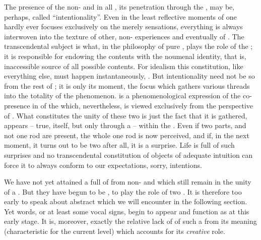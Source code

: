 The presence of the non- and  in all , its penetration
through the , may be, perhaps, called ``intentionality''.  Even in
the least reflective moments of  one hardly ever focuses
exclusively on the merely  sensations, everything is always
interwoven into the texture of other, non- experiences and eventually
of .  The
transcendental subject is what, in the philosophy of pure , plays the
role of the ; it is responsible for endowing the 
contents with the noumenal identity, that is, inaccessible source of all
possible contents.  For idealism this constitution, like everything else, must
happen instantaneously, .  But intentionality need not be so
 from the rest of ; it is only its 
moment, the focus which gathers various threads into the totality of the
 phenomenon.   is a phenomenological expression
of the co-presence in  of the  which,
nevertheless, is viewed exclusively from the perspective of .
What constitutes the unity of these two  is just the fact that it is
gathered, appears -- true, itself, but only through a  -- within the
\hoa.  Even if two parts, and not one rod are present, the whole one rod is now
perceived, and if, in the next moment, it turns out to be two after all, it is a
surprise.  Life is full of such surprises and no transcendental constitution of
objects of adequate intuition can force it to always conform to our
expectations, sorry, intentions.

\pa\label{pa:languageA} We have not yet attained a full  of
 from 
non- and 
 which still remain in the unity of a  \nexus. But
they have begun to be , to play the role of two . It is therefore too early to speak about abstract  which we
will encounter in the following section. Yet words, or at least some vocal
signs, begin to appear and function as  at this early stage. It is,
moreover, exactly the relative lack of  of such a 
from its meaning (characteristic for the current level) which accounts for its
{\em creative} role.

